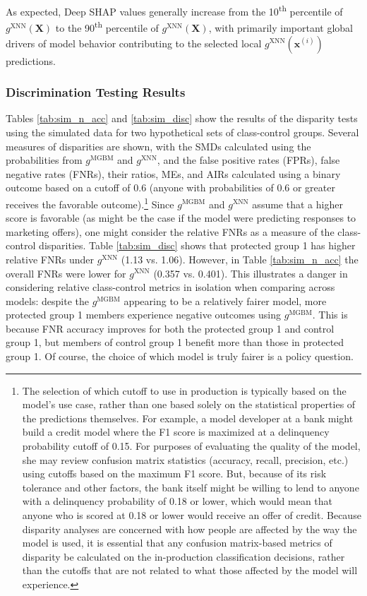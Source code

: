 \documentclass[information,article,submit,moreauthors,pdftex]{definitions/mdpi}
\begin{document}
\noindent As expected, Deep SHAP values generally increase from the 10\textsuperscript{th} percentile of $g^\text{XNN}(\mathbf{X})$ to the 90\textsuperscript{th} percentile of $g^\text{XNN}(\mathbf{X})$, with primarily important global drivers of model behavior contributing to the selected local $g^\text{XNN}(\mathbf{x}^{(i)})$ predictions.

\subsubsection{Discrimination Testing Results}\label{ssec:dis_sim}

Tables \ref{tab:sim_n_acc} and \ref{tab:sim_disc} show the results of the disparity tests using the simulated data for two hypothetical sets of class-control groups.  Several measures of disparities are shown, with the SMDs calculated using the probabilities from $g^{\text{MGBM}}$ and  $g^{\text{XNN}}$, and the false positive rates (FPRs), false negative rates (FNRs), their ratios, MEs, and AIRs calculated using a binary outcome based on a cutoff of 0.6 (anyone with probabilities of 0.6 or greater receives the favorable outcome).\footnote{The selection of which cutoff to use in production is typically based on the model’s use case, rather than one based solely on the statistical properties of the predictions themselves.  For example, a model developer at a bank might build a credit model where the F1 score is maximized at a delinquency probability cutoff of 0.15.  For purposes of evaluating the quality of the model, she may review confusion matrix statistics (accuracy, recall, precision, etc.) using cutoffs based on the maximum F1 score. But, because of its risk tolerance and other factors, the bank itself might be willing to lend to anyone with a delinquency probability of 0.18 or lower, which would mean that anyone who is scored at 0.18 or lower would receive an offer of credit.  Because disparity analyses are concerned with how people are affected by the way the model is used, it is essential that any confusion matrix-based metrics of disparity be calculated on the in-production classification decisions, rather than the cutoffs that are not related to what those affected by the model will experience.} 
Since $g^{\text{MGBM}}$ and $g^{\text{XNN}}$ assume that a higher score is favorable (as might be the case if the model were predicting responses to marketing offers), one might consider the relative FNRs as a measure of the class-control disparities. Table \ref{tab:sim_disc} shows that protected group 1 has higher relative FNRs under $g^{\text{XNN}}$ (1.13 vs. 1.06).  However, in Table \ref{tab:sim_n_acc} the overall FNRs were lower for  $g^{\text{XNN}}$ (0.357 vs. 0.401). This illustrates a danger in considering relative class-control metrics in isolation when comparing across models: despite the $g^\text{MGBM}$ appearing to be a relatively fairer model, more protected group 1 members experience negative outcomes using $g^{\text{MGBM}}$. This is because FNR accuracy improves for both the protected group 1 and control group 1, but members of control group 1 benefit more than those in protected group 1.  Of course, the choice of which model is truly fairer is a policy question.
\end{document}
